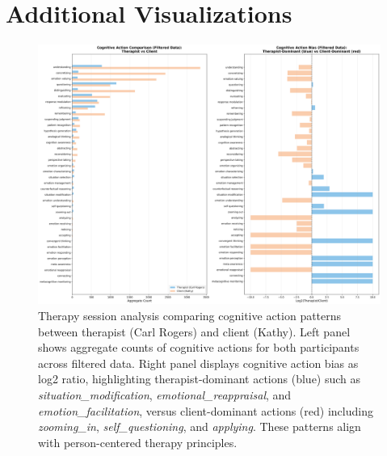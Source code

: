 \documentclass[letterpaper]{article}
\begin{document}


\clearpage
\appendix

\section{Additional Visualizations}

\begin{figure}[t]
\centering
\includegraphics[width=\textwidth]{../Keep_viz/rogers_kathy_comparison.png}
\caption{Therapy session analysis comparing cognitive action patterns between therapist (Carl Rogers) and client (Kathy). Left panel shows aggregate counts of cognitive actions for both participants across filtered data. Right panel displays cognitive action bias as log2 ratio, highlighting therapist-dominant actions (blue) such as \textit{situation\_modification}, \textit{emotional\_reappraisal}, and \textit{emotion\_facilitation}, versus client-dominant actions (red) including \textit{zooming\_in}, \textit{self\_questioning}, and \textit{applying}. These patterns align with person-centered therapy principles.}
\label{fig:therapy_comparison}
\end{figure}
\end{document}
